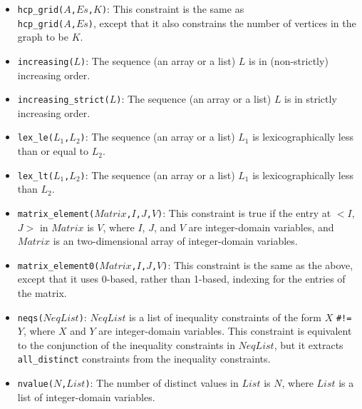 \begin{itemize}
\item \texttt{hcp\_grid($A$,$Es$,$K$)}: This constraint is the same as\\ \texttt{hcp\_grid($A$,$Es$)}, except that it also constrains the number of vertices in the graph to be $K$. 

\item \texttt{increasing($L$)}: The sequence (an array or a list) $L$ is in (non-strictly) increasing order.

\item \texttt{increasing\_strict($L$)}: The sequence (an array or a list) $L$ is in strictly increasing order.

\item \texttt{lex\_le($L_1$,$L_2$)}: The sequence (an array or a list) $L_1$ is lexicographically less than or equal to $L_2$.

\item \texttt{lex\_lt($L_1$,$L_2$)}: The sequence (an array or a list) $L_1$ is lexicographically less than $L_2$.

\item \texttt{matrix\_element($Matrix$,$I$,$J$,$V$)}: This constraint is true if the entry at $<$$I$,$J$$>$ in $Matrix$ is $V$, where $I$, $J$, and $V$ are integer-domain variables, and $Matrix$ is an two-dimensional array of integer-domain variables.

\item \texttt{matrix\_element0($Matrix$,$I$,$J$,$V$)}: This constraint is the same as the above, except that it uses 0-based, rather than 1-based, indexing for the entries of the matrix. 

\item \texttt{neqs($NeqList$)}: $NeqList$ is a list of inequality constraints of the form $X$ \verb+#!=+ $Y$, where $X$ and $Y$ are integer-domain variables. This constraint is equivalent to the conjunction of the inequality constraints in $NeqList$, but it extracts \texttt{all\_distinct} constraints from the inequality constraints. 

\item \texttt{nvalue($N$,$List$)}: The number of distinct values in $List$ is $N$, where $List$ is a list of integer-domain variables.


\end{itemize}
